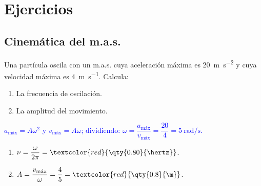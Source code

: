 
\section{Ejercicios}\label{sec:mas-ejercicios}

\subsection{Cinemática del m.a.s.}

\begin{exercise}
    Una partícula oscila con un m.a.s. cuya aceleración máxima es \qty{20}{\m\per\second\squared} y cuya velocidad máxima
    es \qty{4}{\m\per\second}. Calcula:
    \begin{enumerate}[label=\letraminuscula]
        \item La frecuencia de oscilación.
        \item La amplitud del movimiento.
    \end{enumerate}
    \begin{solu}
        \textcolor{blue}{\(a_{\text{máx}} = A\omega^2\) y \(v_{\text{máx}} = A\omega\); dividiendo: \(\omega = \dfrac{a_{\text{máx}}}{v_{\text{máx}}} = \dfrac{20}{4} = \qty{5}{\radian\per\second}\).}
        \begin{enumerate}[label=\letraminuscula]
            \item \(\nu = \dfrac{\omega}{2\pi} = \textcolor{red}{\qty{0.80}{\hertz}}\).
            \item \(A = \dfrac{v_{\text{máx}}}{\omega} = \dfrac{4}{5} = \textcolor{red}{\qty{0.8}{\m}}\).
        \end{enumerate}
    \end{solu}
\end{exercise}

